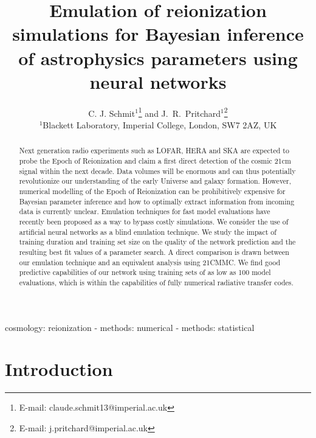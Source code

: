 \documentclass[useAMS,usenatbib]{mnras}
\title[21cm Emulation and Parameter Inference]{Emulation of reionization simulations for Bayesian inference of astrophysics parameters using neural networks}
\author[C.J.Schmit and J.R.Pritchard]{C. J. Schmit$^{1}$\thanks{E-mail:
claude.schmit13@imperial.ac.uk} and J.~R.~Pritchard$^{1}$\thanks{E-mail:
j.pritchard@imperial.ac.uk}\\
$^{1}$Blackett Laboratory, Imperial College, London, SW7 2AZ, UK}
\begin{document}


\maketitle

\label{firstpage}

\begin{abstract}

Next generation radio experiments such as LOFAR, HERA and SKA are expected to probe the Epoch of Reionization and claim a first direct detection of the cosmic 21cm signal within the next decade. 
Data volumes will be enormous and can thus potentially revolutionize our understanding of the early Universe and galaxy formation.  
However, numerical modelling of the Epoch of Reionization can be prohibitively expensive for Bayesian parameter inference and how to optimally extract information from incoming data is currently unclear. 
Emulation techniques for fast model evaluations have recently been proposed as a way to bypass costly simulations.
We consider the use of artificial neural networks as a blind emulation technique.
We study the impact of training duration and training set size on the quality of the network prediction and the resulting best fit values of a parameter search.
A direct comparison is drawn between our emulation technique and an equivalent analysis using 21CMMC.
We find good predictive capabilities of our network using training sets of as low as 100 model evaluations, which is within the capabilities of fully numerical radiative transfer codes.
\end{abstract}

\begin{keywords}
cosmology: reionization - methods: numerical - methods: statistical
\end{keywords}

\section{Introduction} 
\label{sec: intro}
\end{document}
